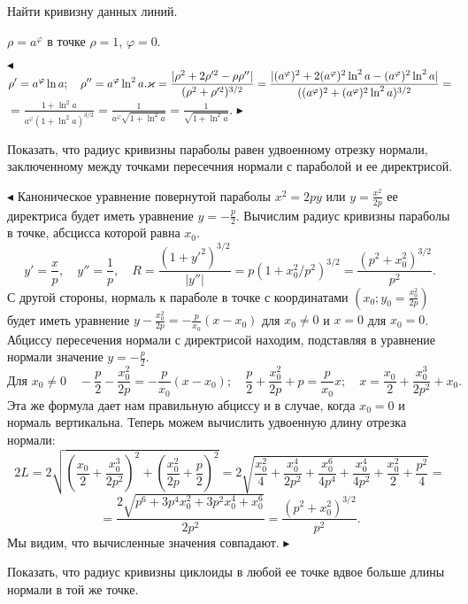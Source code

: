 \documentclass[a5paper,10pt]{article}
\begin{document}
\medskip
\noindent Найти кривизну данных линий.

\medskip
{} $\rho=a^{\varphi}$ в точке $\rho=1$, $\varphi=0$.

\smallskip
\noindent $\blacktriangleleft$
$\displaystyle \rho'=a^\varphi\ln a;\quad \rho''=a^\varphi\ln^2a.\\
\varkappa=\frac{|\rho^2+2\rho'^2-\rho\rho''|}{(\rho^2+\rho'^2)^{3/2}}=
\frac{|(a^{\varphi})^2+2(a^{\varphi})^2\ln^2a-(a^{\varphi})^2\ln^2a|}
{((a^{\varphi})^2+(a^{\varphi})^2\ln^2a)^{3/2}}=$\\
$\displaystyle =\frac{1+\ln^2a}{a^{\varphi}(1+\ln^2a)^{3/2}}=
\frac{1}{a^{\varphi}\sqrt{1+\ln^2a}}=\frac{1}{\sqrt{1+\ln^2a}}$.
$\blacktriangleright$

\medskip
{} Показать, что радиус кривизны параболы равен удвоенному
отрезку нормали, заключенному между точками пересечния
нормали с параболой и ее директрисой.

\smallskip
\noindent $\blacktriangleleft$ Каноническое уравнение повернутой параболы
$x^2=2py$ или $\displaystyle y=\frac{x^2}{2p}$ ее директриса будет иметь уравнение
$\displaystyle y=-\frac{p}{2}$. Вычислим радиус кривизны параболы в точке,
абсцисса которой равна  $x_0$.
$$y'=\frac{x}{p},\quad y''=\frac{1}{p},\quad
R=\frac{(1+y'^2)^{3/2}}{|y''|}=p(1+x_0^2/p^2)^{3/2}=
\frac{(p^2+x_0^2)^{3/2}}{p^2}.$$
С другой стороны, нормаль к параболе в точке с координатами
$\displaystyle \left(x_0; y_0=\frac{x_0^2}{2p}\right)$ будет иметь уравнение
$\displaystyle y-\frac{x_0^2}{2p}=-\frac{p}{x_0}(x-x_0)$ для $x_0\ne0$ и $x=0$ для $x_0=0$.
Абциссу пересечения нормали с директрисой находим, подставляя в уравнение нормали
значение $\displaystyle y=-\frac{p}{2}$.
$$\mbox{Для }x_0\ne 0\quad -\frac{p}{2}-\frac{x_0^2}{2p}=-\frac{p}{x_0}(x-x_0);\quad
\frac{p}{2}+\frac{x_0^2}{2p}+p=\frac{p}{x_0}x;\quad x=\frac{x_0}{2}+\frac{x_0^3}{2p^2}+x_0.$$
Эта же формула дает нам правильную абциссу и в случае, когда $x_0=0$ и нормаль вертикальна.
Теперь можем вычислить удвоенную длину отрезка нормали:
$$2L=2\sqrt{\left(\frac{x_0}{2}+\frac{x_0^3}{2p^2}\right)^2+
\left(\frac{x_0^2}{2p}+\frac{p}{2}\right)^2}=
2\sqrt{\frac{x_0^2}{4}+\frac{x_0^4}{2p^2}+\frac{x_0^6}{4p^4}+
\frac{x_0^4}{4p^2}+\frac{x_0^2}{2}+\frac{p^2}{4}}=$$
$$=\frac{2\sqrt{p^6+3p^4x_0^2+3p^2x_0^4+x_0^6}}{2p^2}=
\frac{(p^2+x_0^2)^{3/2}}{p^2}.$$
Мы видим, что вычисленные значения совпадают. $\blacktriangleright$

\medskip
{} Показать, что радиус кривизны циклоиды в любой ее точке вдвое больше
длины нормали в той же точке.
\end{document}
